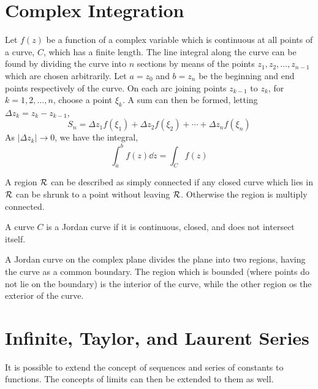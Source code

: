 \section{Complex Integration}
\label{sec:complexint}

\begin{definition}
  Let $f(z)$ be a function of a complex variable which is continuous
  at all points of a curve, $C$, which has a finite length. The line
  integral along the curve can be found by dividing the curve into $n$
  sections by means of the points $z_1, z_2, \dots, z_{n-1}$ which are
  chosen arbitrarily. Let $a = z_0$ and $b=z_n$ be the beginning and
  end points respectively of the curve. On each arc joining points
  $z_{k-1}$ to $z_k$, for $k = 1, 2, \dots, n$, choose a point
  $\xi_k$. A sum can then be formed, letting $\Delta z_k = z_k - z_{k-1}$,
  \[S_n = \Delta z_1 f(\xi_1) + \Delta z_2 f(\xi_2) + \cdots + \Delta
  z_n f(\xi_n) \] As $|\Delta z_k| \to 0$, we have the integral,
  \[ \int_a^b f(z) \dd{z} = \int_C f(z) \]
\end{definition}

\begin{definition}
  A region ${\cal R}$ can be described as simply connected if any
  closed curve which lies in ${\cal R}$ can be shrunk to a point
  without leaving ${\cal R}$. Otherwise the region is multiply
  connected.
\end{definition}

\begin{definition}
  A curve $C$ is a Jordan curve if it is continuous, closed, and does
  not intersect itself.
\end{definition}

\begin{theorem}
  A Jordan curve on the complex plane divides the plane into two
  regions, having the curve as a common boundary.  The region which is
  bounded (where points do not lie on the boundary) is the interior of
  the curve, while the other region os the exterior of the curve.
\end{theorem}

\section{Infinite, Taylor, and Laurent Series}
\label{sec:infin-tayl-laur}

It is possible to extend the concept of sequences and series of
constants to functions. The concepts of limits can then be extended to
them as well.

